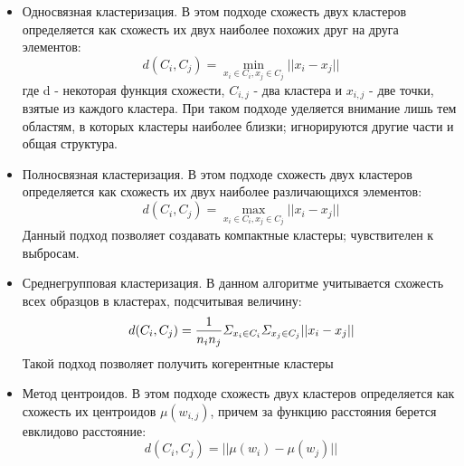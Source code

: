 \documentclass[12pt, a4paper]{article}
\begin{document}
\begin{itemize}
\item Односвязная кластеризация. В этом подходе схожесть двух кластеров определяется как схожесть их двух наиболее похожих друг на друга элементов:
\[
\ d(C_i, C_j) =  \min_{x_i \in C_i, x_j \in C_j} ||x_i - x_j||
\]
где d - некоторая функция схожести, $C_{i, j}$ - два кластера и $x_{i, j}$ - две точки, взятые из каждого кластера. При таком подходе уделяется внимание лишь тем областям, в которых кластеры наиболее близки; игнорируются другие части и общая структура.
\item Полносвязная кластеризация. В этом подходе схожесть двух кластеров определяется как схожесть их двух наиболее различающихся элементов:
\[
\ d(C_i, C_j) =  \max_{x_i \in C_i, x_j \in C_j} ||x_i - x_j||
\]
Данный подход позволяет создавать компактные кластеры; чувствителен к выбросам.
\item Среднегрупповая кластеризация. В данном алгоритме учитывается схожесть всех образцов в кластерах, подсчитывая величину:
\[
\ d(C_i, C_j) = \frac{1}{n_{i}n_{j}}{\mit\Sigma}_{x_i \in C_i}{\mit\Sigma}_{x_j \in C_j}||x_i - x_j||
\]
Такой подход позволяет получить когерентные кластеры
\item Метод центроидов. В этом подходе схожесть двух кластеров определяется как схожесть их центроидов $\mu(w_{i,j})$, причем за функцию расстояния берется евклидово расстояние:
\[
\ d(C_i, C_j) =||\mu(w_i)-\mu(w_j)||
\]
\end{itemize}
\end{document}
